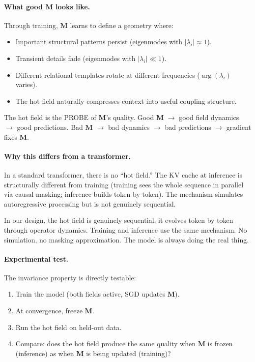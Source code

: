 \documentclass[11pt, a4paper]{article}
\newcommand{\M}{\mathbf{M}}
\theoremstyle{plain}
\theoremstyle{definition}
\theoremstyle{remark}
\begin{document}
\paragraph{What good $\M$ looks like.}
Through training, $\M$ learns to define a geometry where:
\begin{itemize}[nosep]
\item Important structural patterns persist (eigenmodes with $|\lambda_i| \approx 1$).
\item Transient details fade (eigenmodes with $|\lambda_i| \ll 1$).
\item Different relational templates rotate at different frequencies ($\arg(\lambda_i)$ varies).
\item The hot field naturally compresses context into useful coupling structure.
\end{itemize}

The hot field is the PROBE of $\M$'s quality.
Good $\M$ $\to$ good field dynamics $\to$ good predictions.
Bad $\M$ $\to$ bad dynamics $\to$ bad predictions $\to$ gradient fixes $\M$.

\paragraph{Why this differs from a transformer.}
In a standard transformer, there is no ``hot field.''
The KV cache at inference is structurally different from training (training sees the whole sequence in parallel via causal masking; inference builds token by token).
The mechanism simulates autoregressive processing but is not genuinely sequential.

In our design, the hot field is genuinely sequential, it evolves token by token through operator dynamics.
Training and inference use the same mechanism.
No simulation, no masking approximation.
The model is always doing the real thing.

\paragraph{Experimental test.}
The invariance property is directly testable:
\begin{enumerate}[nosep]
\item Train the model (both fields active, SGD updates $\M$).
\item At convergence, freeze $\M$.
\item Run the hot field on held-out data.
\item Compare: does the hot field produce the same quality when $\M$ is frozen (inference) as when $\M$ is being updated (training)?
\end{enumerate}
\end{document}
